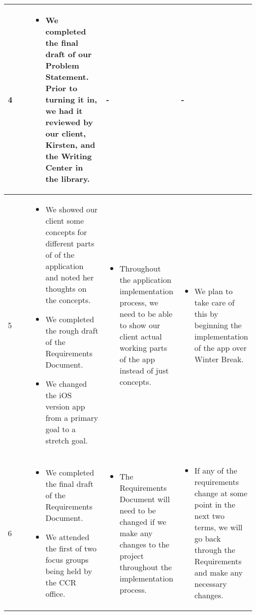 \documentclass[draftclsnofoot, onecolumn, 10pt, compsoc]{IEEEtran}
\begin{document}
\begin{longtable}{|p{0.1\linewidth}|p{0.3\linewidth}|p{0.3\linewidth}|p{0.3\linewidth}|}
         4
         &
         \begin{itemize}
            \item We completed the final draft of our Problem Statement. Prior to turning it in, we had it reviewed by our client, Kirsten, and the Writing Center in the library.
         \end{itemize}
         & -
         & - \\ \hline

         5
         &
         \begin{itemize}
            \item We showed our client some concepts for different parts of of the application and noted her thoughts on the concepts.
            \item We completed the rough draft of the Requirements Document.
            \item We changed the iOS version app from a primary goal to a stretch goal.
         \end{itemize}
         &
         \begin{itemize}
            \item Throughout the application implementation process, we need to be able to show our client actual working parts of the app instead of just concepts.
         \end{itemize}
         &
         \begin{itemize}
            \item We plan to take care of this by beginning the implementation of the app over Winter Break.
         \end{itemize} \\ \hline

         6
         &
         \begin{itemize}
            \item We completed the final draft of the Requirements Document.
            \item We attended the first of two focus groups being held by the CCR office.
         \end{itemize}
         &
         \begin{itemize}
            \item The Requirements Document will need to be changed if we make any changes to the project throughout the implementation process.
         \end{itemize}
         &
         \begin{itemize}
            \item If any of the requirements change at some point in the next two terms, we will go back through the Requirements and make any necessary changes.
         \end{itemize} \\ \hline


\end{longtable}
\end{document}
